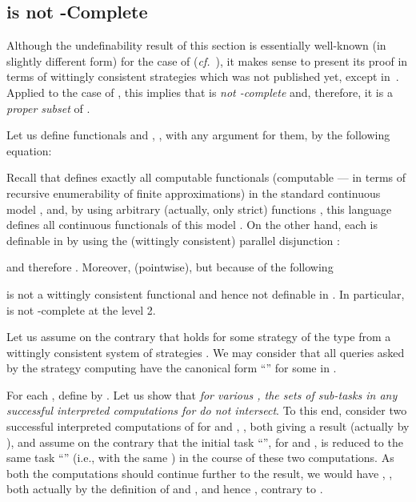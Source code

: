 \documentclass[fleqn]{LMCS}
\theoremstyle{plain}\newtheorem{satz}[thm]{Satz}
\theoremstyle{plain}\newtheorem{hyp}[thm]{Hypothesis}
\theoremstyle{plain}\newtheorem{hyps}[thm]{Hypotheses}
\theoremstyle{definition}\newtheorem{note}[thm]{Note}
\def\cf{{\em cf.}}
\newcommand{\?}{\mbox{?}}
\begin{document}
\subsection{\texorpdfstring{}{W} is not 
\texorpdfstring{}{omega}-Complete}
\label{seq:non-complete}

\noindent
Although the undefinability result of this section is essentially 
well-known (in slightly different form) for the case of  
(\cf\ \cite{Plotkin77,Saz76d,Saz76AL}), 
it makes sense to present its proof in terms of wittingly consistent 
strategies which was not published yet, except in~\cite{Saz76t}. 
Applied to the case of , this implies that 
 is \emph{not -complete} and, therefore, 
it is a \emph{proper subset} of . 

Let us define functionals  and , 
, with  any argument for them, 
by the following equation: 

Recall that  defines exactly all computable 
functionals (computable --- in terms of recursive enumerability of finite approximations) 
in the standard continuous model , and, 
by using arbitrary (actually, only strict) 
functions 
, 
this language defines all continuous functionals of this model 
\cite{Plotkin77,Saz76d,Saz76AL}. 
On the other hand, each  is definable in  by using 
the (wittingly consistent) parallel disjunction : 

and therefore . 
Moreover,  (pointwise), but 
 because of the following
\begin{prop}
 
is not a wittingly consistent functional 
and hence not definable in . 
In particular,  is not -complete at the level 2. 
\end{prop}
\proof  
Let us assume on the contrary that  holds 
for some strategy  of the type 
\mbox{} from a wittingly consistent system of strategies 
. We may consider that 
all queries asked by the strategy  computing  have the canonical form 
``'' for some  in . 

For each , define 
 by . 
Let us show that \emph{for various , the sets of sub-tasks in any successful 
interpreted computations for  do not intersect}.
To this end, consider two successful interpreted computations of  
for  and , , both giving a result (actually  
by ), and 
assume on the contrary that the initial task ``'', 
for  and , is reduced to the same task ``'' 
(i.e., with the same ) 
in the course of these two computations. 
As both the computations should continue further to the result, 
we would have 
, , 
both actually  by the definition of  and ,  
and hence 
, 
contrary to . 
\end{document}
